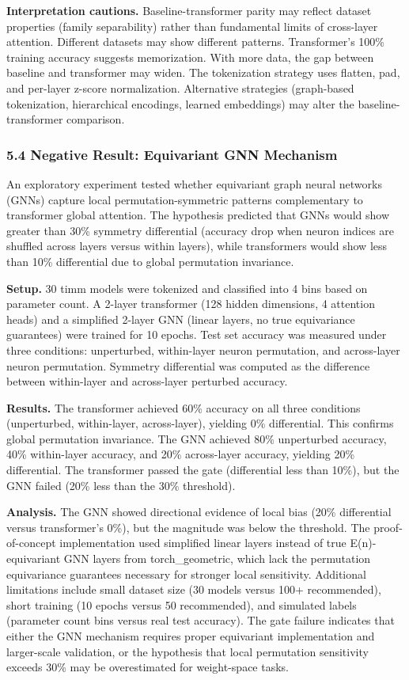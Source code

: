 \textbf{Interpretation cautions.} Baseline-transformer parity may reflect dataset properties (family separability) rather than fundamental limits of cross-layer attention. Different datasets may show different patterns. Transformer's 100\% training accuracy suggests memorization. With more data, the gap between baseline and transformer may widen. The tokenization strategy uses flatten, pad, and per-layer z-score normalization. Alternative strategies (graph-based tokenization, hierarchical encodings, learned embeddings) may alter the baseline-transformer comparison.

\subsubsection{5.4 Negative Result: Equivariant GNN Mechanism}

An exploratory experiment tested whether equivariant graph neural networks (GNNs) capture local permutation-symmetric patterns complementary to transformer global attention. The hypothesis predicted that GNNs would show greater than 30\% symmetry differential (accuracy drop when neuron indices are shuffled across layers versus within layers), while transformers would show less than 10\% differential due to global permutation invariance.

\textbf{Setup.} 30 timm models were tokenized and classified into 4 bins based on parameter count. A 2-layer transformer (128 hidden dimensions, 4 attention heads) and a simplified 2-layer GNN (linear layers, no true equivariance guarantees) were trained for 10 epochs. Test set accuracy was measured under three conditions: unperturbed, within-layer neuron permutation, and across-layer neuron permutation. Symmetry differential was computed as the difference between within-layer and across-layer perturbed accuracy.

\textbf{Results.} The transformer achieved 60\% accuracy on all three conditions (unperturbed, within-layer, across-layer), yielding 0\% differential. This confirms global permutation invariance. The GNN achieved 80\% unperturbed accuracy, 40\% within-layer accuracy, and 20\% across-layer accuracy, yielding 20\% differential. The transformer passed the gate (differential less than 10\%), but the GNN failed (20\% less than the 30\% threshold).

\textbf{Analysis.} The GNN showed directional evidence of local bias (20\% differential versus transformer's 0\%), but the magnitude was below the threshold. The proof-of-concept implementation used simplified linear layers instead of true E(n)-equivariant GNN layers from torch\_geometric, which lack the permutation equivariance guarantees necessary for stronger local sensitivity. Additional limitations include small dataset size (30 models versus 100+ recommended), short training (10 epochs versus 50 recommended), and simulated labels (parameter count bins versus real test accuracy). The gate failure indicates that either the GNN mechanism requires proper equivariant implementation and larger-scale validation, or the hypothesis that local permutation sensitivity exceeds 30\% may be overestimated for weight-space tasks.

